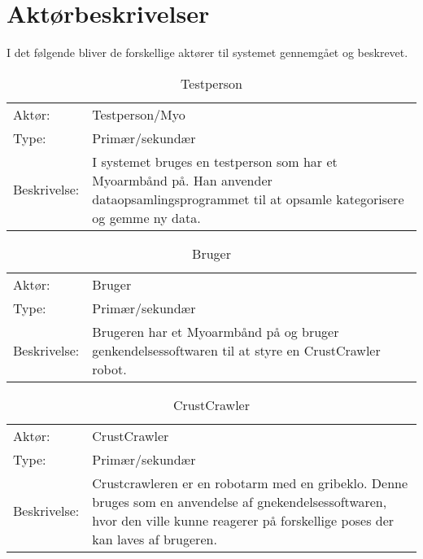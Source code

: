 \thispagestyle{fancy}
\chapter{Aktørbeskrivelser}
\label{chp:aktorbeskrivelser}
I det følgende bliver de forskellige aktører til systemet gennemgået og beskrevet.
\bgroup
\def\arraystretch{1.8}
\begin{center}
	\begin{table}[htbp]
		\begin{tabular}{lp{10cm}}
			\rowcolor{grey} Aktør:		& Testperson/Myo \\
			Type: 	& Primær/sekundær \\
			Beskrivelse:				& I systemet bruges en testperson som har et Myoarmbånd på. Han anvender dataopsamlingsprogrammet til at opsamle kategorisere og gemme ny data.
		\end{tabular}
		\caption{Testperson}
		\label{tab:testperson}
	\end{table}
\end{center}

\begin{center}
	\begin{table}[htbp]
		\begin{tabular}{lp{10cm}}
			\rowcolor{grey} Aktør:		& Bruger \\
			Type: 	& Primær/sekundær \\
			Beskrivelse:				& Brugeren har et Myoarmbånd på og bruger genkendelsessoftwaren til at styre en CrustCrawler robot.
		\end{tabular}
		\caption{Bruger}
		\label{tab:bruger}
	\end{table}
\end{center}

\begin{center}
	\begin{table}[htbp]
		\begin{tabular}{lp{10cm}}
			\rowcolor{grey} Aktør:		& CrustCrawler \\
			Type: 	& Primær/sekundær \\
			Beskrivelse:				& Crustcrawleren er en robotarm med en gribeklo. Denne bruges som en anvendelse af gnekendelsessoftwaren, hvor den ville kunne reagerer på forskellige poses der kan laves af brugeren.
		\end{tabular}
		\caption{CrustCrawler}
		\label{tab:crustcrawler}
	\end{table}
\end{center}
\egroup